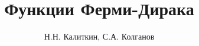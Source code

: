 \documentclass[11pt,a4paper]{book}
\begin{document}
\title{Функции Ферми-Дирака}
\author{Н.Н. Калиткин, С.А. Колганов}
\maketitle
\tableofcontents














\end{document}
